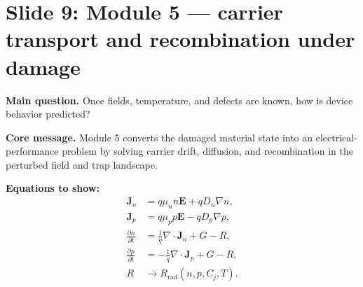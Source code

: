 \documentclass[11pt]{article}
\begin{document}
\section{Slide 9: Module 5 --- carrier transport and recombination under damage}
\begin{physicsbox}
\textbf{Main question.} Once fields, temperature, and defects are known, how is device behavior predicted?
\end{physicsbox}

\textbf{Core message.} Module 5 converts the damaged material state into an electrical-performance problem by solving carrier drift, diffusion, and recombination in the perturbed field and trap landscape.

\textbf{Equations to show:}
\begin{align*}
\bm{J}_n &= q\mu_n n\bm{E} + qD_n\nabla n,\\
\bm{J}_p &= q\mu_p p\bm{E} - qD_p\nabla p,\\
\frac{\partial n}{\partial t} &= \frac{1}{q}\nabla\cdot \bm{J}_n + G - R,\\
\frac{\partial p}{\partial t} &= -\frac{1}{q}\nabla\cdot \bm{J}_p + G - R,\\
R &\rightarrow R_{\mathrm{rad}}(n,p,C_j,T).
\end{align*}
\end{document}
